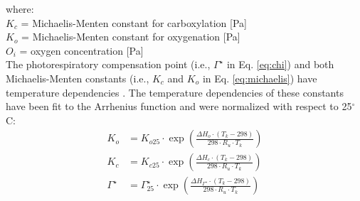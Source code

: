 \noindent where:\\
\indent $K_c$ = Michaelis-Menten constant for carboxylation [Pa]\\
\indent $K_o$ = Michaelis-Menten constant for oxygenation [Pa]\\
\indent $O_i$ = oxygen concentration [Pa]\\

\noindent The photorespiratory compensation point (i.e., $\Gamma^{\star}$ in Eq. \ref{eq:chi}) and both Michaelis-Menten constants (i.e., $K_c$ and $K_o$ in Eq. \ref{eq:michaelis}) have temperature dependencies \parencite{farquhar80}.  
The temperature dependencies of these constants have been fit to the Arrhenius function and were normalized with respect to 25$^{\circ}$C:
%
%
%
%
%
%
\begin{subequations}
\label{eq:kckogs}
\begin{align}
        K_o&=K_{o25} \cdot \exp \left( 
             \frac{\Delta H_o \cdot \left( T_k-298 \right)}
                  {298 \cdot R_{u} \cdot T_k}
             \right) \label{eq:ko} \\
        K_c&=K_{c25} \cdot \exp \left( 
             \frac{\Delta H_c \cdot \left( T_k-298 \right)}
                  {298 \cdot R_{u} \cdot T_k}
             \right) \label{eq:kc} \\
        \Gamma^{\star}&=\Gamma^{\star}_{25} \cdot \exp \left(
			\frac{\Delta H_{\Gamma^{\star}} \cdot \left( T_k - 298 \right)}
			     {298 \cdot R_{u} \cdot T_k} 	
        	\right) \label{eq:gs}
\end{align}
\end{subequations}

